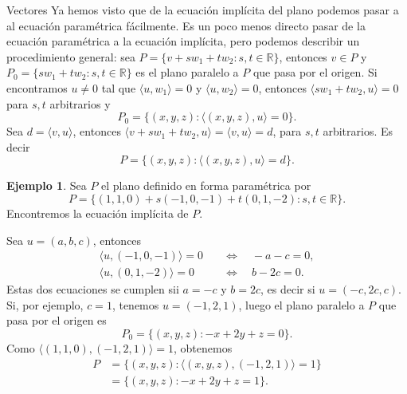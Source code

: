 \documentclass[a4paper,12pt,twoside,spanish,reqno]{amsbook}
\theoremstyle{definition}
\newtheorem{ejemplo}{Ejemplo}[section]
\theoremstyle{remark}
\newcommand{\la}{\langle}
\newcommand{\ra}{\rangle}
\newcommand{\R}{\mathbb R}
\begin{document}
\begin{chapter}{Vectores}
    Ya  hemos visto que de la ecuación implícita del plano podemos pasar a al ecuación paramétrica fácilmente. Es un poco menos directo pasar de la ecuación paramétrica a la ecuación implícita, pero podemos describir un procedimiento general: sea $P = \{v + sw_1 + tw_2: s,t \in \R\}$,  entonces $v \in P$ y $P_0 = \{sw_1 + tw_2: s,t \in \R\}$  es el plano paralelo a $P$  que pasa por el origen. Si encontramos $u \ne 0$ tal que $\la u,w_1 \ra =0$ y $\la u,w_2 \ra =0$, entonces $ \la  sw_1 + tw_2, u \ra =0$ para  $s,t$ arbitrarios y 
    \begin{equation*}
    P_0 = \{(x,y,z): \la (x,y,z),u \ra =0\}. 
    \end{equation*}
    Sea $d = \la v, u \ra$, entonces $\la v + sw_1 + tw_2, u\ra = \la v , u\ra =d$, para $s,t$ arbitrarios. Es decir
    \begin{equation*}
    P = \{(x,y,z): \la (x,y,z),u \ra =d\}. 
    \end{equation*}
      
    \begin{ejemplo}
        Sea $P$ el plano definido en forma paramétrica por 
        \begin{equation*}
            P = \{ (1,1,0) + s(-1,0,-1) + t(0,1,-2): s,t \in \R\}.
        \end{equation*}
         Encontremos la ecuación implícita de  $P$. 
         
         Sea $u= (a,b,c)$,  entonces 
        \begin{align*}
            \la u,(-1,0,-1) \ra = 0 \quad &\Leftrightarrow \quad -a -c=0, \\
            \la u,(0,1,-2) \ra = 0 \quad &\Leftrightarrow \quad b -2c=0.
        \end{align*} 
        Estas dos ecuaciones se cumplen sii $a = -c$ y $b=2c$, es decir si $u=(-c,2c,c)$. Si, por ejemplo, $c=1$, tenemos $u=(-1,2,1)$, luego el plano paralelo a $P$  que pasa por el origen es
        \begin{equation*}
        P_0 = \{(x,y,z): -x+2y+z =0\}. 
        \end{equation*}
        Como $\la (1,1,0),(-1,2,1) \ra = 1 $, obtenemos
        \begin{align*}
        P &= \{(x,y,z): \la (x,y,z),(-1,2,1) \ra =1\} \\
        &= \{(x,y,z): -x+2y+z =1\}.
        \end{align*}
            
        
    \end{ejemplo}

    \end{chapter}
\end{document}
